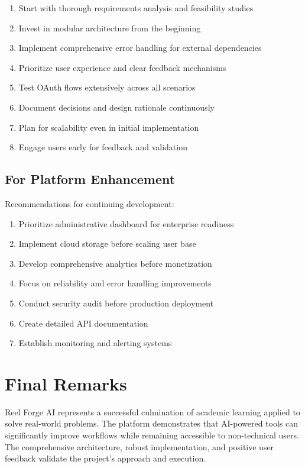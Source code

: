 \begin{enumerate}
    \item Start with thorough requirements analysis and feasibility studies
    \item Invest in modular architecture from the beginning
    \item Implement comprehensive error handling for external dependencies
    \item Prioritize user experience and clear feedback mechanisms
    \item Test OAuth flows extensively across all scenarios
    \item Document decisions and design rationale continuously
    \item Plan for scalability even in initial implementation
    \item Engage users early for feedback and validation
\end{enumerate}

\subsection{For Platform Enhancement}

Recommendations for continuing development:

\begin{enumerate}
    \item Prioritize administrative dashboard for enterprise readiness
    \item Implement cloud storage before scaling user base
    \item Develop comprehensive analytics before monetization
    \item Focus on reliability and error handling improvements
    \item Conduct security audit before production deployment
    \item Create detailed API documentation
    \item Establish monitoring and alerting systems
\end{enumerate}

\section{Final Remarks}

Reel Forge AI represents a successful culmination of academic learning applied to solve real-world problems. The platform demonstrates that AI-powered tools can significantly improve workflows while remaining accessible to non-technical users. The comprehensive architecture, robust implementation, and positive user feedback validate the project's approach and execution.


